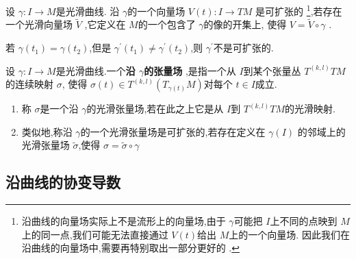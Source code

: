 \documentclass[../../main.tex]{subfiles}
\begin{document}
\hspace*{\fill} 

\begin{proposition}
    设 \(   \gamma : I\to M  \)是光滑曲线. 沿 \(   \gamma   \)的一个向量场 \(  V\left( t \right)   :I\to TM\)  是可扩张的 \footnote{沿曲线的向量场实际上不是流形上的向量场,由于 \(   \gamma   \)可能把 \(  I  \)上不同的点映到 \(  M  \)上的同一点,我们可能无法直接通过 \(  V  \left( t \right) \)给出 \(  M  \)上的一个向量场. 因此我们在沿曲线的向量场中,需要再特别取出一部分更好的 . },若存在一个光滑向量场 \(  \tilde{V}  \) ,它定义在 \(  M  \)的一个包含了 \(   \gamma   \)的像的开集上,  使得  \(  V =  \tilde{V}\circ  \gamma   \) .
\end{proposition}

\begin{remark}
    若 \(   \gamma \left( t_1 \right)=  \gamma \left( t_2 \right)    \),但是 \(   \gamma ^{\prime} \left( t_1 \right)\neq  \gamma ^{\prime} \left( t_2 \right)    \),则 \(   \gamma ^{\prime}   \)不是可扩张的.   
\end{remark}

\begin{definition}
    设 \(   \gamma :I\to M  \)是光滑曲线.一个\textbf{沿 \(   \gamma   \)的张量场 },是指一个从 \(  I  \)到某个张量丛 \(  T^{\left( k,l \right) } TM \)的连续映射  \(   \sigma   \),
    使得 \(   \sigma \left( t \right) \in T^{\left( k,l \right) }\left( T_{ \gamma \left( t \right) }M \right)    \)对每个 \(  t \in I  \)成立.     
\end{definition}
\begin{remark}
   \begin{enumerate}
    \item  称 \(   \sigma   \)是一个沿 \(   \gamma   \)的光滑张量场,若在此之上它是从 \(  I  \)到 \(  T^{\left( k,l \right) }TM  \)的光滑映射.
    \item 类似地,称沿 \(   \gamma   \)的一个光滑张量场是可扩张的,若存在定义在 \(   \gamma \left( I \right)   \)   的邻域上的光滑张量场 \(   \tilde{\sigma}   \),使得 \(   \sigma =   \tilde{\sigma} \circ  \gamma   \)  
   \end{enumerate}
       
\end{remark}


\subsection{沿曲线的协变导数}
\end{document}
